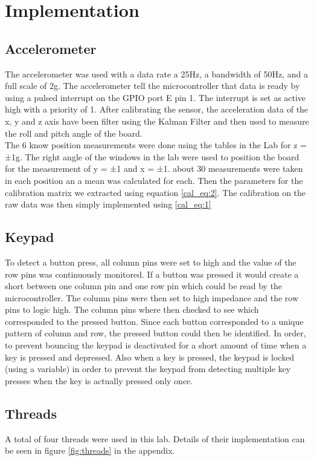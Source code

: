 \documentclass[12pt]{article}
\begin{document}
\section{Implementation}
\subsection{Accelerometer}
The accelerometer was used with a data rate a 25Hz, a bandwidth of 50Hz, and a full scale of 2g. The accelerometer tell the microcontroller that data is ready by using a pulsed interrupt on the GPIO port E pin 1. The interrupt is set as active high with a priority of 1. After calibrating the sensor, the acceleration data of the x, y and z axis have been filter using the Kalman Filter and then used to measure the roll and pitch angle of the board. \\

The 6 know position measurements were done using the tables in the Lab for z = ±1g. The right angle of the windows in the lab were used to position the board for the measurement of y = ±1 and x = ±1. about 30 measurements were taken in each position an a mean was calculated for each. Then the parameters for the calibration matrix we extracted using equation \ref{cal_eq:2}. The calibration on the raw data was then simply implemented using \ref{cal_eq:1}

\subsection{Keypad} \label{implementation:keypad}
To detect a button press, all column pins were set to high and the value of the row pins was continuously monitored. If a button was pressed it would create a short between one column pin and one row pin which could be read by the microcontroller. The column pins were then set to high impedance and the row pins to logic high. The column pins where then checked to see which corresponded to the pressed button. Since each button corresponded to a unique pattern of column and row, the pressed button could then be identified. In order, to prevent bouncing the keypad is deactivated for a short amount of time when a key is pressed and depressed. Also when a key is pressed, the keypad is locked (using a variable) in order to prevent the keypad from detecting multiple key presses when the key is actually pressed only once.

\subsection{Threads}
A total of four threads were used in this lab. Details of their implementation can be seen in figure \ref{fig:threads} in the appendix.
\end{document}
